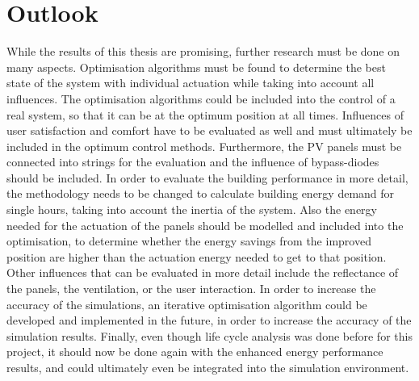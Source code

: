 \chapter{Outlook}
\label{ch:outlook}

While the results of this thesis are promising, further research must be done on many aspects. Optimisation algorithms must be found to determine the best state of the system with individual actuation while taking into account all influences. The optimisation algorithms could be included into the control of a real system, so that it can be at the optimum position at all times. Influences of user satisfaction and comfort have to be evaluated as well and must ultimately be included in the optimum control methods. Furthermore, the PV panels must be connected into strings for the evaluation and the influence of bypass-diodes should be included. In order to evaluate the building performance in more detail, the methodology needs to be changed to calculate building energy demand for single hours, taking into account the inertia of the system. Also the energy needed for the actuation of the panels should be modelled and included into the optimisation, to determine whether the energy savings from the improved position are higher than the actuation energy needed to get to that position. Other influences that can be evaluated in more detail include the reflectance of the panels, the ventilation, or the user interaction. In order to increase the accuracy of the simulations, an iterative optimisation algorithm could be developed and implemented in the future, in order to increase the accuracy of the simulation results. Finally, even though life cycle analysis was done before for this project, it should now be done again with the enhanced energy performance results, and could ultimately even be integrated into the simulation environment. 





